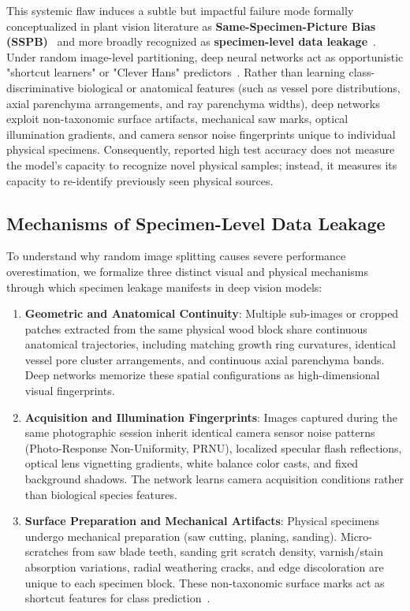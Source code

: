 This systemic flaw induces a subtle but impactful failure mode formally conceptualized in plant vision literature as \textbf{Same-Specimen-Picture Bias (SSPB)}~\cite{figueroamata2022} and more broadly recognized as \textbf{specimen-level data leakage}~\cite{varoquaux2022,roberts2021}. Under random image-level partitioning, deep neural networks act as opportunistic "shortcut learners" or "Clever Hans" predictors~\cite{geirhos2020,lapuschkin2019}. Rather than learning class-discriminative biological or anatomical features (such as vessel pore distributions, axial parenchyma arrangements, and ray parenchyma widths), deep networks exploit non-taxonomic surface artifacts, mechanical saw marks, optical illumination gradients, and camera sensor noise fingerprints unique to individual physical specimens. Consequently, reported high test accuracy does not measure the model's capacity to recognize novel physical samples; instead, it measures its capacity to re-identify previously seen physical sources.

\subsection{Mechanisms of Specimen-Level Data Leakage}
To understand why random image splitting causes severe performance overestimation, we formalize three distinct visual and physical mechanisms through which specimen leakage manifests in deep vision models:

\begin{enumerate}[label=\textbf{Mechanism \arabic*:}, leftmargin=*]
\item \textbf{Geometric and Anatomical Continuity}: Multiple sub-images or cropped patches extracted from the same physical wood block share continuous anatomical trajectories, including matching growth ring curvatures, identical vessel pore cluster arrangements, and continuous axial parenchyma bands. Deep networks memorize these spatial configurations as high-dimensional visual fingerprints.

\item \textbf{Acquisition and Illumination Fingerprints}: Images captured during the same photographic session inherit identical camera sensor noise patterns (Photo-Response Non-Uniformity, PRNU), localized specular flash reflections, optical lens vignetting gradients, white balance color casts, and fixed background shadows. The network learns camera acquisition conditions rather than biological species features.

\item \textbf{Surface Preparation and Mechanical Artifacts}: Physical specimens undergo mechanical preparation (saw cutting, planing, sanding). Micro-scratches from saw blade teeth, sanding grit scratch density, varnish/stain absorption variations, radial weathering cracks, and edge discoloration are unique to each specimen block. These non-taxonomic surface marks act as shortcut features for class prediction~\cite{geirhos2020}.
\end{enumerate}

